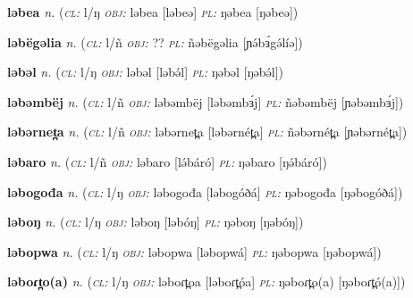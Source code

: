 \newentry
\headword\textbf{ləbea} 
\ipa{[ləbeə]}
\synpos\textit{n.} 
\class(\textit{\textsc{cl:}} {l/ŋ}
\object\textit{\textsc{obj:}} ləbea [ləbeə]
\plural\textit{\textsc{pl:}} ŋəbea [ŋəbeə])

\newentry
\headword\textbf{ləbëgəlia}  
\ipa{[lə́bɜ́gə́líə]}
\synpos\textit{n.} 
\class(\textit{\textsc{cl:}} {l/ñ}
\object\textit{\textsc{obj:}} ??
\plural\textit{\textsc{pl:}} ñəbëgəlia [ɲə́bɜ́gə́líə])

\newentry
\headword\textbf{ləbəl}  
\ipa{[ləbə́l]}
\synpos\textit{n.} 
\class(\textit{\textsc{cl:}} {l/ŋ}
\object\textit{\textsc{obj:}} ləbəl [ləbə́l]
\plural\textit{\textsc{pl:}} ŋəbəl [ŋəbə́l])

\newentry
\headword\textbf{ləbəmbëj}  
\ipa{[ləbəmbɜ́j]}
\synpos\textit{n.} 
\class(\textit{\textsc{cl:}} {l/ñ}
\object\textit{\textsc{obj:}} ləbəmbëj [ləbəmbɜ́j]
\plural\textit{\textsc{pl:}} ñəbəmbëj [ɲəbəmbɜ́j])

\newentry
\headword\textbf{ləbərnet̪a}  
\ipa{[ləbərnét̪a]}
\synpos\textit{n.} 
\class(\textit{\textsc{cl:}} {l/ñ}
\object\textit{\textsc{obj:}} ləbərnet̪a [ləbərnét̪a]
\plural\textit{\textsc{pl:}} ñəbərnét̪a [ɲəbərnét̪a])

\newentry
\headword\textbf{ləbaro}  %
\ipa{[lə́báró]}
\synpos\textit{n.} 
\class(\textit{\textsc{cl:}} {l/ñ}
\object\textit{\textsc{obj:}} ləbaro [lə́báró]
\plural\textit{\textsc{pl:}} ŋəbaro [ŋə́báró])

\newentry
\headword\textbf{ləbogođa} 
\ipa{[ləbogóðá]}
\synpos\textit{n.} 
\class(\textit{\textsc{cl:}} {l/ŋ}
\object\textit{\textsc{obj:}} ləbogođa [ləbogóðá]
\plural\textit{\textsc{pl:}} ŋəbogođa [ŋəbogóðá])

\newentry
\headword\textbf{ləboŋ} 
\ipa{[ləbóŋ]}
\synpos\textit{n.} 
\class(\textit{\textsc{cl:}} {l/ŋ}
\object\textit{\textsc{obj:}} ləboŋ [ləbóŋ]
\plural\textit{\textsc{pl:}} ŋəboŋ [ŋəbóŋ])

\newentry
\headword\textbf{ləbopwa} 
\ipa{[ləbopwá]}
\synpos\textit{n.} 
\class(\textit{\textsc{cl:}} {l/ŋ}
\object\textit{\textsc{obj:}} ləbopwa [ləbopwá]
\plural\textit{\textsc{pl:}} ŋəbopwa [ŋəbopwá])

\newentry
\headword\textbf{ləboɾt̪o(a)} 
\ipa{[ləboɾt̪ó(a)]}
\synpos\textit{n.} 
\class(\textit{\textsc{cl:}} {l/ŋ}
\object\textit{\textsc{obj:}} ləboɾt̪oa [ləboɾt̪óa]
\plural\textit{\textsc{pl:}} ŋəboɾt̪o(a) [ŋəboɾt̪ó(a)])

